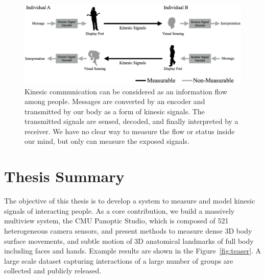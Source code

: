 


\begin{figure}[t]
	\centering
	\includegraphics[trim=0 0 0 0, clip=true, width=\textwidth]{figures/kinesicflow2}
	\caption{Kinesic communication can be considered as an information flow among people. Messages are converted by an encoder and transmitted by our body as a form of kinesic signals. The transmitted signals are sensed, decoded, and finally interpreted by a receiver. We have no clear way to measure the flow or status inside our mind, but only can measure the exposed signals.}	
	\label{fig:kinesicflow}
\end{figure}


\section{Thesis  Summary}

The objective of this thesis is to develop a system to measure and model kinesic signals of interacting people. As a core contribution, we build a massively multiview system, the CMU Panoptic Studio, which is composed of 521 heterogeneous camera sensors, and present methods to measure dense 3D body surface movements, and subtle motion of 3D anatomical landmarks of full body including faces and hands. Example results are shown in the Figure~\ref{fig:teaser}. A large scale dataset capturing interactions of a large number of groups are collected and publicly released.

